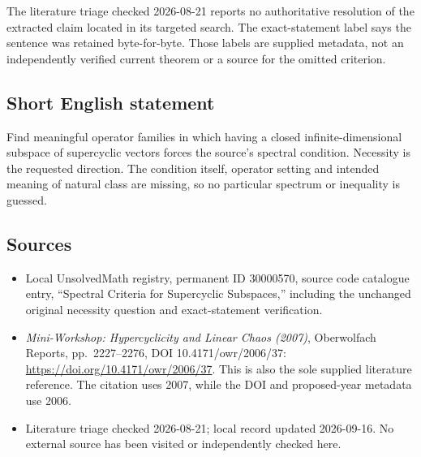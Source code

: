 \documentclass[11pt]{article}
\begin{document}
The literature triage checked 2026-08-21 reports no authoritative resolution of the extracted claim located in its targeted search. The exact-statement label says the sentence was retained byte-for-byte. Those labels are supplied metadata, not an independently verified current theorem or a source for the omitted criterion.
\subsection{Short English statement}
Find meaningful operator families in which having a closed infinite-dimensional subspace of supercyclic vectors forces the source's spectral condition. Necessity is the requested direction. The condition itself, operator setting and intended meaning of natural class are missing, so no particular spectrum or inequality is guessed.
\subsection{Sources}
\begin{itemize}
\item Local UnsolvedMath registry, permanent ID 30000570, source code catalogue entry, ``Spectral Criteria for Supercyclic Subspaces,'' including the unchanged original necessity question and exact-statement verification.
\item \emph{Mini-Workshop: Hypercyclicity and Linear Chaos (2007)}, Oberwolfach Reports, pp.\ 2227--2276, DOI 10.4171/owr/2006/37: \url{https://doi.org/10.4171/owr/2006/37}. This is also the sole supplied literature reference. The citation uses 2007, while the DOI and proposed-year metadata use 2006.
\item Literature triage checked 2026-08-21; local record updated 2026-09-16. No external source has been visited or independently checked here.
\end{itemize}
\end{document}
